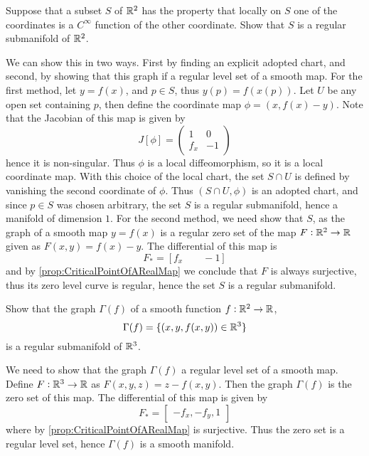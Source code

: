 \begin{problem}
	Suppose that a subset $ S $ of $ \mathbb{R}^2 $ has the property that locally on $ S $ one of the coordinates is a $ C^\infty $ function of the other coordinate. Show that $ S $ is a regular submanifold of $ \mathbb{R}^2 $.
\end{problem}
\begin{solution}
	We can show this in two ways. First by finding an explicit adopted chart, and second, by showing that this graph if a regular level set of a smooth map. For the first method, let $ y = f(x) $, and $ p \in S $, thus $ y(p) = f(x(p)) $. Let $ U $ be any open set containing $ p $, then define the coordinate map $ \phi = (x,f(x)-y) $. Note that the Jacobian of this map is given by
	\[ J[\phi] = \begin{pmatrix}
		1 & 0 \\
		f_x & -1
	\end{pmatrix} \]
	hence it is non-singular. Thus $ \phi $ is a local diffeomorphism, so it is a local coordinate map. With this choice of the local chart, the set $ S \cap U $ is defined by vanishing the second coordinate of $ \phi $. Thus $ (S\cap U, \phi) $ is an adopted chart, and since $ p \in S $ was chosen arbitrary, the set $ S $ is a regular submanifold, hence a manifold of dimension $ 1 $. For the second method, we need show that $ S $, as the graph of a smooth map $ y = f(x) $ is a regular zero set of the map $ F: \mathbb{R}^2 \to \mathbb{R} $ given as $ F(x,y) = f(x) - y $. The differential of this map is 
	\[ F_* = \left[  f_x \qquad -1 \right] \]
	and by \autoref{prop:CriticalPointOfARealMap} we conclude that $ F $ is always surjective, thus its zero level curve is regular, hence the set $ S $ is a regular submanifold.
\end{solution}

\begin{problem}
	Show that the graph $ \Gamma(f) $ of a smooth function $ f: \mathbb{R}^2 \to \mathbb{R} $,
	\[ \Gamma(f) = \{(x,y,f(x,y)) \in \mathbb{R}^3\} \]
	is a regular submanifold of $ \mathbb{R}^3 $.
\end{problem}
\begin{solution}
	We need to show that the graph $ \Gamma(f) $ a regular level set of a smooth map. Define $ F: \mathbb{R}^3 \to \mathbb{R} $ as $ F(x,y,z) = z-f(x,y) $. Then the graph $ \Gamma(f) $ is the zero set of this map. The differential of this map is given by
	\[ F_* = \begin{bmatrix}
		-f_x, -f_y, 1
	\end{bmatrix} \]
	where by \autoref{prop:CriticalPointOfARealMap} is surjective. Thus the zero set is a regular level set, hence $ \Gamma(f) $ is a smooth manifold.
\end{solution}

